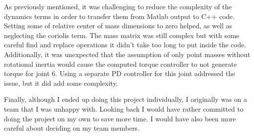 \documentclass[conference]{IEEEtran}
\begin{document}
As previously mentioned, it was challenging to reduce the complexity of the
dynamics terms in order to transfer them from Matlab output to C++ code. Setting
some of relative center of mass dimensions to zero helped, as well as neglecting
the coriolis term. The mass matrix was still complex but with some careful find
and replace operations it didn't take too long to put inside the
code. Additionally, it was unexpected that the assumption of only point masses
without rotational inertia would cause the computed torque controller to not
generate torque for joint 6. Using a separate PD controller for this joint
addressed the issue, but it did add some complexity.

Finally, although I ended up doing this project individually, I originally was
on a team that I was unhappy with. Looking back I would have rather committed to
doing the project on my own to save more time. I would have also been more
careful about deciding on my team members.



\end{document}
